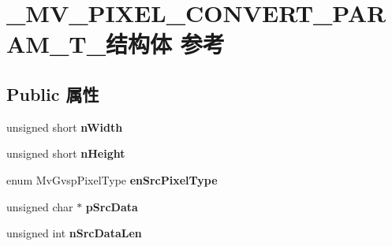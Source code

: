 \hypertarget{struct___m_v___p_i_x_e_l___c_o_n_v_e_r_t___p_a_r_a_m___t__}{}\section{\+\_\+\+M\+V\+\_\+\+P\+I\+X\+E\+L\+\_\+\+C\+O\+N\+V\+E\+R\+T\+\_\+\+P\+A\+R\+A\+M\+\_\+\+T\+\_\+结构体 参考}
\label{struct___m_v___p_i_x_e_l___c_o_n_v_e_r_t___p_a_r_a_m___t__}
\subsection*{Public 属性}
\begin{DoxyCompactItemize}
\item 
\mbox{\label{struct___m_v___p_i_x_e_l___c_o_n_v_e_r_t___p_a_r_a_m___t___a14d7899b7d256ad5f35b79ee8760abe6}} 
unsigned short {\bfseries n\+Width}
\item 
\mbox{\label{struct___m_v___p_i_x_e_l___c_o_n_v_e_r_t___p_a_r_a_m___t___aacd55116c9a8c02c569f46a1f46289d2}} 
unsigned short {\bfseries n\+Height}
\item 
\mbox{\label{struct___m_v___p_i_x_e_l___c_o_n_v_e_r_t___p_a_r_a_m___t___a48ce2fa8a0b41b03c452971de7b4573f}} 
enum Mv\+Gvsp\+Pixel\+Type {\bfseries en\+Src\+Pixel\+Type}
\item 
\mbox{\label{struct___m_v___p_i_x_e_l___c_o_n_v_e_r_t___p_a_r_a_m___t___a3694914de55efe25aea214a09ea6a161}} 
unsigned char $\ast$ {\bfseries p\+Src\+Data}
\item 
\mbox{\label{struct___m_v___p_i_x_e_l___c_o_n_v_e_r_t___p_a_r_a_m___t___a6cb3e03f7b7e37e033909aaac87a3e0f}} 
unsigned int {\bfseries n\+Src\+Data\+Len}
\item 
\mbox{\label{struct___m_v___p_i_x_e_l___c_o_n_v_e_r_t___p_a_r_a_m___t___a8c6c961fa83b22903da8b89b1e752aba}} 

\end{DoxyCompactItemize}
